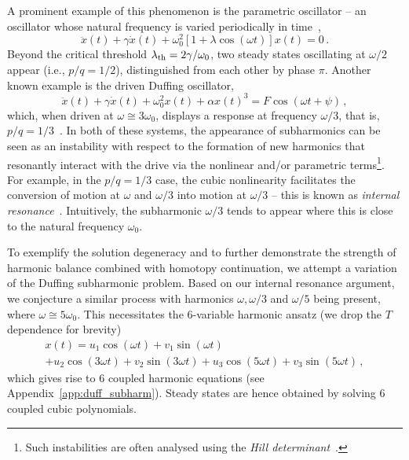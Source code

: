 A prominent example of this phenomenon is the parametric oscillator -- an oscillator whose natural frequency is varied periodically in time~\cite{Rand_2005, Papariello_2016},
\begin{equation}
\ddot{x}(t) + \gamma \dot {x}(t) + \omega_0^2 \left[1 + \lambda \cos(\omega t)\right] x(t) = 0\,.
\end{equation}
Beyond the critical threshold $\lambda_{\rm th} = 2 \gamma / \omega_0$, two steady states oscillating at $\omega/2$ appear (i.e., $p/q = 1/2$), distinguished from each other by phase $\pi$. Another known example is the driven Duffing oscillator,
\begin{equation} \label{eq:hopf_duffing}
\ddot{x}(t) + \gamma \dot{x}(t) + \omega_0^2 x(t) + \alpha x(t)^3 = F \cos(\omega t + \psi) \,,
\end{equation}
which, when driven at $\omega \cong 3 \omega_0$, displays a response at frequency $\omega/3$, that is, $p/q=1/3$~\cite{Arndt_2022, Jordan_Smith}. In both of these systems, the appearance of subharmonics can be seen as an instability with respect to the formation of new harmonics that resonantly interact with the drive via the nonlinear and/or parametric terms\footnote{Such instabilities are often analysed using the \textit{Hill determinant}~\cite{Richards}.}. For example, in the $p/q = 1/3$ case, the cubic nonlinearity facilitates the conversion of motion at $\omega$ and $\omega/3$ into motion at $\omega/3$ -- this is known as \textit{internal resonance}~\cite{Nayfeh_Mook, Manevich}. Intuitively, the subharmonic $\omega/3$ tends to appear where this is close to the natural frequency $\omega_0$. 

To exemplify the solution degeneracy and to further demonstrate the strength of harmonic balance combined with homotopy continuation, we attempt a variation of the Duffing subharmonic problem. Based on our internal resonance argument, we conjecture a similar process with harmonics $\omega, \omega/3$ and $\omega /5$ being present, where $\omega \cong 5 \omega_0$. This necessitates the 6-variable harmonic ansatz (we drop the $T$ dependence for brevity)
\begin{multline} \label{eq:hopf_5_ansatz}
x(t) = u_1 \cos(\omega t) + v_1 \sin(\omega t) \\
+ u_2 \cos(3\omega t) + v_2 \sin(3\omega t) +  u_3 \cos(5\omega t) + v_3 \sin(5\omega t) \,,
\end{multline}
which gives rise to 6 coupled harmonic equations (see Appendix~\ref{app:duff_subharm}). Steady states are hence obtained by solving 6 coupled cubic polynomials. 

